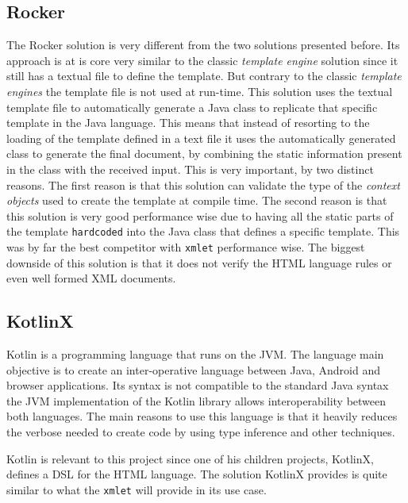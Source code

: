 \subsection{Rocker}
\label{sec:rocker}

The Rocker\cite{rocker} solution is very different from the two solutions presented before. Its approach is at is core very similar to the classic \textit{template engine} solution since it still has a textual file to define the template. But contrary to the classic \textit{template engines} the template file is not used at run-time. This solution uses the textual template file to automatically generate a Java class to replicate that specific template in the Java language. This means that instead of resorting to the loading of the template defined in a text file it uses the automatically generated class to generate the final document, by combining the static information present in the class with the received input. This is very important, by two distinct reasons. The first reason is that this solution can validate the type of the \textit{context objects} used to create the template at compile time. The second reason is that this solution is very good performance wise due to having all the static parts of the template \texttt{hardcoded} into the Java class that defines a specific template. This was by far the best competitor with \texttt{xmlet} performance wise. The biggest downside of this solution is that it does not verify the \ac{HTML} language rules or even well formed \ac{XML} documents.

\subsection{KotlinX}
\label{sec:kotlinx}

Kotlin\cite{kotlin} is a programming language that runs on the \ac{JVM}. The language main objective is to create an inter-operative language between Java, Android and browser applications. Its syntax is not compatible to the standard Java syntax the \ac{JVM} implementation of the Kotlin library allows interoperability between both languages. The main reasons to use this language is that it heavily reduces the verbose needed to create code by using type inference and other techniques. 

\noindent
Kotlin is relevant to this project since one of his children projects, KotlinX, defines a \ac{DSL} for the \ac{HTML} language. The solution KotlinX provides is quite similar to what the \texttt{xmlet} will provide in its use case. 

